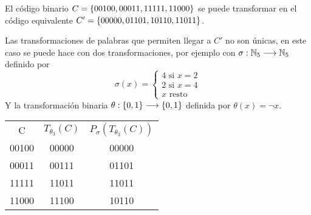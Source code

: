 \begin{example}
	El código binario $C=\left\{00100, 00011, 11111, 11000\right\}$ se puede transformar en el código equivalente  $C'=\left\{00000, 01101, 10110, 11011\right\}$.

	Las transformaciones de palabras que permiten llegar a $C'$ no son únicas, en este caso se puede hace con dos transformaciones, por ejemplo con $\sigma:\mathbb{N}_5\longrightarrow \mathbb{N}_5$ definido por
	\[
		\sigma(x)=\begin{cases}
			          4 \text{ si } x=2\\
			          2 \text{ si } x=4\\
			          x \text{ resto}
		\end{cases}
	\]
	Y la transformación binaria $\theta:\left\{0, 1\right\}\longrightarrow \left\{0, 1\right\}$ definida por $\theta(x)=\neg x$.
	\begin{center}
		\begin{tabular}{ccc}
			C     & $T_{\theta_3}(C)$ & $P_\sigma(T_{\theta_3}(C))$ \\
			00100 & 00000             & 00000                       \\
			00011 & 00111             & 01101                       \\
			11111 & 11011             & 11011                       \\
			11000 & 11100             & 10110
		\end{tabular}
	\end{center}
\end{example}